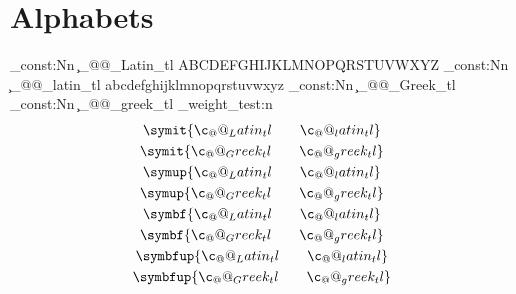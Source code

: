 \section{Alphabets}

\tl_const:Nn \c_@@_Latin_tl { ABCDEFGHIJKLMNOPQRSTUVWXYZ }
\tl_const:Nn \c_@@_latin_tl { abcdefghijklmnopqrstuvwxyz }
\tl_const:Nn \c_@@_Greek_tl
  {
    \Alpha      \Beta       \Gamma      \Delta      \Epsilon
    \Zeta       \Eta        \Theta      \varTheta   \Iota
    \Kappa      \Lambda     \Mu         \Nu         \Xi
    \Omicron    \Pi         \Rho        \Sigma      \Tau
    \Upsilon    \Phi        \Chi        \Psi        \Omega
  }
\tl_const:Nn \c_@@_greek_tl
  {
    \alpha      \beta       \gamma      \delta      \epsilon
    \varepsilon \zeta       \eta        \theta      \vartheta 
    \iota       \kappa      \varkappa   \lambda     \mu
    \nu         \xi         \omicron    \pi         \rho
    \varrho     \sigma      \varsigma   \tau        \upsilon
    \phi        \varphi     \chi        \psi        \omega
  }
\@@_weight_test:n
  {
    \begin{gather*}
      \symit   { \c_@@_Latin_tl \qquad \c_@@_latin_tl } \\
      \symit   { \c_@@_Greek_tl \qquad \c_@@_greek_tl } \\
      \symup   { \c_@@_Latin_tl \qquad \c_@@_latin_tl } \\
      \symup   { \c_@@_Greek_tl \qquad \c_@@_greek_tl } \\
      \symbf   { \c_@@_Latin_tl \qquad \c_@@_latin_tl } \\
      \symbf   { \c_@@_Greek_tl \qquad \c_@@_greek_tl } \\
      \symbfup { \c_@@_Latin_tl \qquad \c_@@_latin_tl } \\
      \symbfup { \c_@@_Greek_tl \qquad \c_@@_greek_tl }
    \end{gather*}
  }
